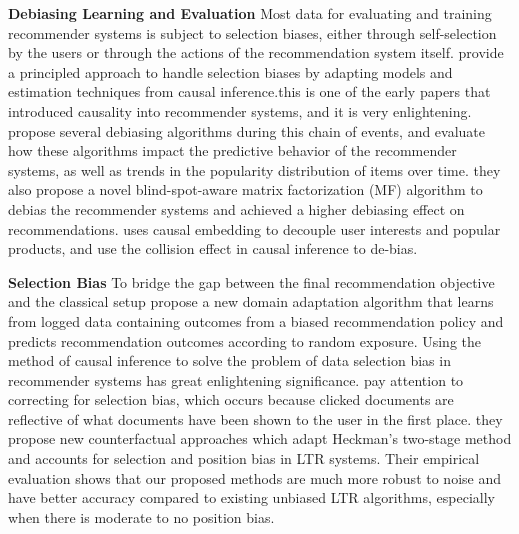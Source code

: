 \documentclass{article}
\begin{document}
\textbf{Debiasing Learning and Evaluation} Most data for evaluating and training recommender systems is subject to selection biases, either through self-selection by the users or through the actions of the recommendation system itself. \cite{schnabel2016recommendations} provide a principled approach to handle selection biases by adapting models and estimation techniques from causal inference.this is one of the early papers that introduced causality into recommender systems, and it is very enlightening. \cite{sun2019debiasing} propose several debiasing algorithms during this chain of events, and evaluate how these algorithms impact the predictive behavior of the recommender systems, as well as trends in the popularity distribution of items over time. they also propose a novel blind-spot-aware matrix factorization (MF) algorithm to debias the recommender systems and achieved a higher debiasing effect
on recommendations.\cite{zheng2021disentangling} uses causal embedding to decouple user interests and popular products, and use the collision effect in causal inference to de-bias.


\textbf{Selection Bias} To bridge the gap between the final recommendation objective and the classical setup \cite{bonner2018causal} propose a new domain adaptation algorithm that learns from logged data
containing outcomes from a biased recommendation policy and predicts recommendation outcomes according to random exposure. Using the method of causal inference to solve the problem of data selection bias in recommender systems has great enlightening significance.  \cite{ovaisi2020correcting} pay attention to correcting for selection bias, which occurs because clicked documents are reflective of what documents have been shown to the user in the first place. they propose new counterfactual approaches which adapt Heckman’s two-stage method and accounts for selection and position bias in LTR systems. Their empirical evaluation shows that our proposed methods are much more robust to noise and have better accuracy compared to existing unbiased LTR algorithms, especially when there is moderate to no position bias.
\end{document}
